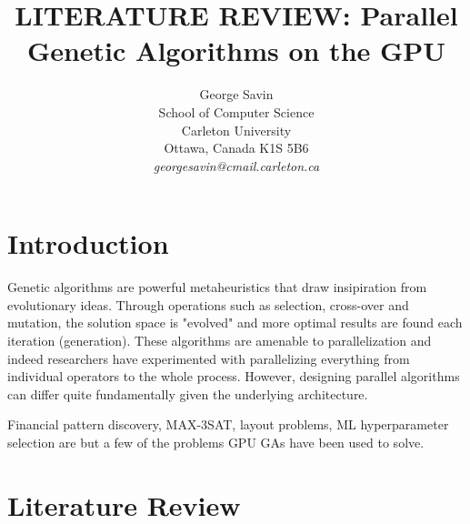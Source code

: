 \documentclass[11pt]{article}       %
\begin{document}


\title{LITERATURE REVIEW: Parallel Genetic Algorithms on the GPU}


\author{
George Savin\\
School of Computer Science\\
Carleton University\\
Ottawa, Canada K1S 5B6\\
{\em georgesavin@cmail.carleton.ca}
} %

\maketitle

\section{Introduction} \label{intro}

Genetic algorithms are powerful metaheuristics that draw insipiration from evolutionary ideas. Through operations such as selection, cross-over and mutation, the solution space is "evolved" and more optimal results are found each iteration (generation). These algorithms are amenable to parallelization and indeed researchers have experimented with parallelizing everything from individual operators to the whole process. However, designing parallel algorithms can differ quite fundamentally given the underlying architecture. 

Financial pattern discovery, MAX-3SAT, layout problems, ML hyperparameter selection \cite{} are but a few of the problems GPU GAs have been used to solve.

\section{Literature Review} \label{litrev}
\end{document}

